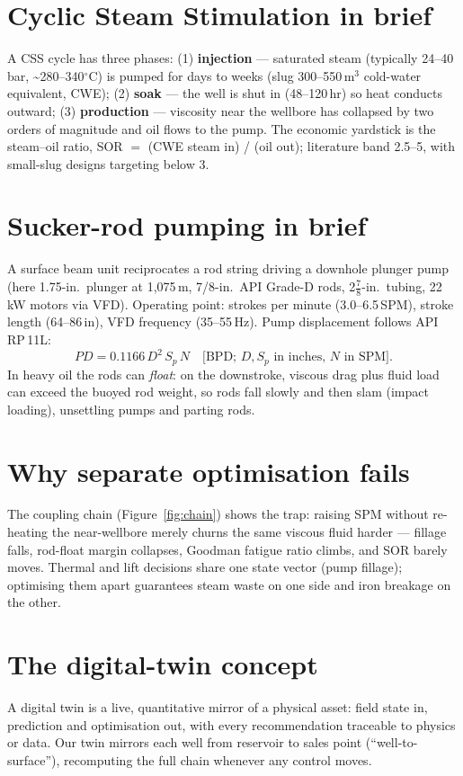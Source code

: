 \documentclass[12pt,a4paper]{report}
\begin{document}
\section{Cyclic Steam Stimulation in brief}
A CSS cycle has three phases: (1) \textbf{injection} --- saturated steam
(typically 24--40\,bar, \textasciitilde280--340$^\circ$C) is pumped for days to
weeks (slug 300--550\,m$^3$ cold-water equivalent, CWE); (2) \textbf{soak} ---
the well is shut in (48--120\,hr) so heat conducts outward; (3)
\textbf{production} --- viscosity near the wellbore has collapsed by two orders
of magnitude and oil flows to the pump. The economic yardstick is the
steam--oil ratio, SOR $=$ (CWE steam in) / (oil out); literature band 2.5--5,
with small-slug designs targeting below 3.

\section{Sucker-rod pumping in brief}
A surface beam unit reciprocates a rod string driving a downhole plunger pump
(here 1.75-in.\ plunger at 1,075\,m, 7/8-in.\ API Grade-D rods, 2$\tfrac78$-in.\
tubing, 22\,kW motors via VFD). Operating point: strokes per minute
(3.0--6.5\,SPM), stroke length (64--86\,in), VFD frequency (35--55\,Hz). Pump
displacement follows API RP\,11L:
\begin{equation}
PD = 0.1166\, D^{2}\, S_{p}\, N \quad \text{[BPD; $D,S_{p}$ in inches, $N$ in SPM]}.
\label{eq:pd}
\end{equation}
In heavy oil the rods can \emph{float}: on the downstroke, viscous drag plus
fluid load can exceed the buoyed rod weight, so rods fall slowly and then slam
(impact loading), unsettling pumps and parting rods.

\section{Why separate optimisation fails}
The coupling chain (Figure~\ref{fig:chain}) shows the trap: raising SPM without
re-heating the near-wellbore merely churns the same viscous fluid harder ---
fillage falls, rod-float margin collapses, Goodman fatigue ratio climbs, and SOR
barely moves. Thermal and lift decisions share one state vector (pump fillage);
optimising them apart guarantees steam waste on one side and iron breakage on
the other.

\section{The digital-twin concept}
A digital twin is a live, quantitative mirror of a physical asset: field state
in, prediction and optimisation out, with every recommendation traceable to
physics or data. Our twin mirrors each well from reservoir to sales point
(``well-to-surface''), recomputing the full chain whenever any control moves.
\end{document}
